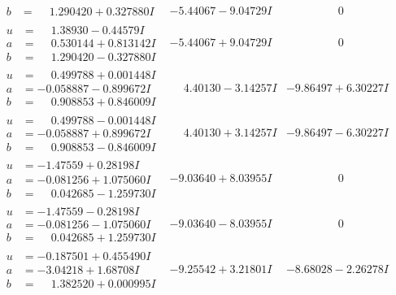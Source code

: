 \documentclass[1p]{elsarticle_modified}
\theoremstyle{definition}
\begin{document}
$$\begin{array}{c|c|c}
\begin{aligned}
b &= \phantom{-}1.290420 + 0.327880 I\end{aligned}
 & -5.44067 - 9.04729 I & \phantom{-0.000000 } 0 \\ \hline\begin{aligned}
u &= \phantom{-}1.38930 - 0.44579 I \\
a &= \phantom{-}0.530144 + 0.813142 I \\
b &= \phantom{-}1.290420 - 0.327880 I\end{aligned}
 & -5.44067 + 9.04729 I & \phantom{-0.000000 } 0 \\ \hline\begin{aligned}
u &= \phantom{-}0.499788 + 0.001448 I \\
a &= -0.058887 - 0.899672 I \\
b &= \phantom{-}0.908853 + 0.846009 I\end{aligned}
 & \phantom{-}4.40130 - 3.14257 I & -9.86497 + 6.30227 I \\ \hline\begin{aligned}
u &= \phantom{-}0.499788 - 0.001448 I \\
a &= -0.058887 + 0.899672 I \\
b &= \phantom{-}0.908853 - 0.846009 I\end{aligned}
 & \phantom{-}4.40130 + 3.14257 I & -9.86497 - 6.30227 I \\ \hline\begin{aligned}
u &= -1.47559 + 0.28198 I \\
a &= -0.081256 + 1.075060 I \\
b &= \phantom{-}0.042685 - 1.259730 I\end{aligned}
 & -9.03640 + 8.03955 I & \phantom{-0.000000 } 0 \\ \hline\begin{aligned}
u &= -1.47559 - 0.28198 I \\
a &= -0.081256 - 1.075060 I \\
b &= \phantom{-}0.042685 + 1.259730 I\end{aligned}
 & -9.03640 - 8.03955 I & \phantom{-0.000000 } 0 \\ \hline\begin{aligned}
u &= -0.187501 + 0.455490 I \\
a &= -3.04218 + 1.68708 I \\
b &= \phantom{-}1.382520 + 0.000995 I\end{aligned}
 & -9.25542 + 3.21801 I & -8.68028 - 2.26278 I \\ \hline\begin{aligned}

\end{aligned}
\end{array}$$
\end{document}
